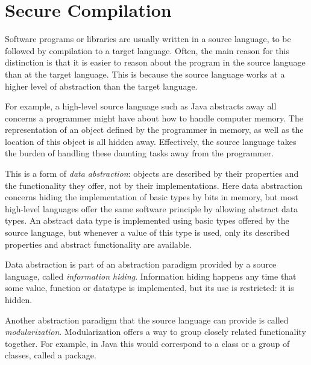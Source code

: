 \section{Secure Compilation}
\label{sec:SecureCompilation}
Software programs or libraries are usually written in a source language, to be followed by compilation to a target language.
Often, the main reason for this distinction is that it is easier to reason about the program in the source language than at the target language.
This is because the source language works at a higher level of abstraction than the target language.

For example, a high-level source language such as Java abstracts away all concerns a programmer might have about how to handle computer memory.
The representation of an object defined by the programmer in memory, as well as the location of this object is all hidden away.
Effectively, the source language takes the burden of handling these daunting tasks away from the programmer.

This is a form of \emph{data abstraction}: objects are described by their properties and the functionality they offer, not by their implementations.
Here data abstraction concerns hiding the implementation of basic types by bits in memory, but most high-level languages offer the same software principle by allowing abstract data types. 
An abstract data type is implemented using basic types offered by the source language, but whenever a value of this type is used, only its described properties and abstract functionality are available.

Data abstraction is part of an abstraction paradigm provided by a source language, called \emph{information hiding}.
Information hiding happens any time that some value, function or datatype is implemented, but its use is restricted: it is hidden.

Another abstraction paradigm that the source language can provide is called \emph{modularization}.
Modularization offers a way to group closely related functionality together. For example, in Java this would correspond to a class or a group of classes, called a package.

